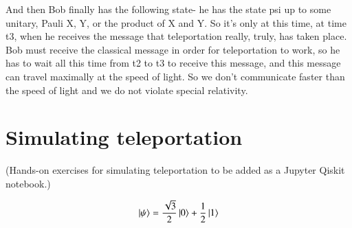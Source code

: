 And then Bob finally has the following state- he has the state psi up to some unitary, Pauli X, Y, or the product of X and Y. So it's only at this time, at time t3, when he receives the message that teleportation really, truly, has taken place. Bob must receive the classical message in order for teleportation to work, so he has to wait all this time from t2 to t3 to receive this message, and this message can travel maximally at the speed of light. So we don't communicate faster than the speed of light and we do not violate special relativity.


\section{Simulating teleportation}

(Hands-on exercises for simulating teleportation to be added as a Jupyter Qiskit notebook.)


\newpage
\begin{exercises}
\begin{equation*}
\ket{\psi} = \frac{\sqrt{3}}{2}\ket{0} + \frac{1}{2}\ket{1}
\end{equation*}


\end{exercises}

